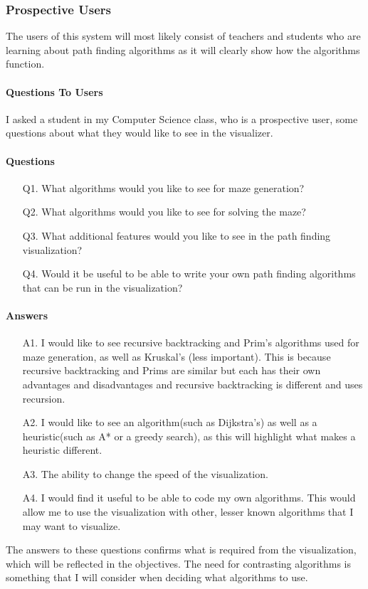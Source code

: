 \documentclass[titlepage]{article}
\begin{document}
\subsubsection{Prospective Users}
The users of this system will most likely consist of teachers and students who are learning about path finding algorithms as it will clearly show how the algorithms function.
\paragraph{Questions To Users}
I asked a student in my Computer Science class, who is a prospective user, some questions about what they would like to see in the visualizer.
\paragraph*{Questions}
\begin{enumerate}
    \item[Q1.]What algorithms would you like to see for maze generation?
    \item[Q2.]What algorithms would you like to see for solving the maze?
    \item[Q3.]What additional features would you like to see in the path finding visualization?
    \item[Q4.]Would it be useful to be able to write your own path finding algorithms that can be run in the visualization?  
\end{enumerate}
\paragraph*{Answers}
\begin{enumerate}
    \item[A1.]I would like to see recursive backtracking and Prim's algorithms used for maze generation, as well as Kruskal's (less important). This is because recursive backtracking and Prims are similar but each has their own advantages and disadvantages and recursive backtracking is different and uses recursion.
    \item[A2.]I would like to see an algorithm(such as Dijkstra's) as well as a heuristic(such as A* or a greedy search), as this will highlight what makes a heuristic different.
    \item[A3.]The ability to change the speed of the visualization.
    \item[A4.]I would find it useful to be able to code my own algorithms. This would allow me to use the visualization with other, lesser known algorithms that I may want to visualize.
\end{enumerate}
The answers to these questions confirms what is required from the visualization, which will be reflected in the objectives. The need for contrasting algorithms is something that I will consider when deciding what algorithms to use.
\end{document}
